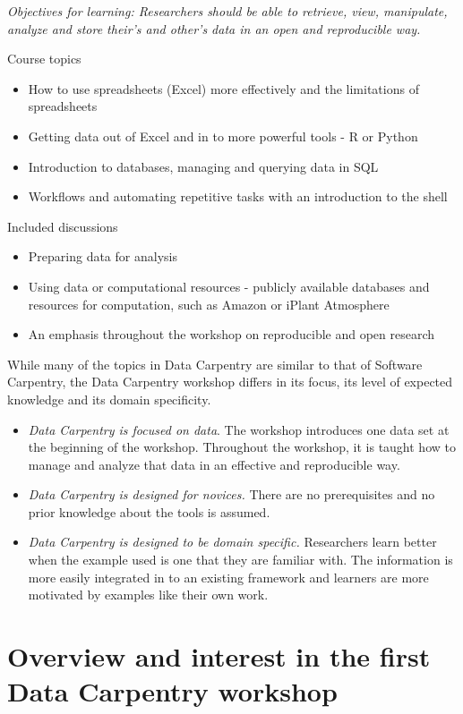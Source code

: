 \documentclass[11pt]{article}
\begin{document}
\emph{Objectives for learning: Researchers should be able to retrieve, view, manipulate, analyze and store their's and other's data in an open and reproducible way.}

Course topics
\begin{itemize}
\item How to use spreadsheets (Excel) more effectively and the limitations of spreadsheets
\item Getting data out of Excel and in to more powerful tools - R or Python
\item Introduction to databases, managing and querying data in SQL
\item Workflows and automating repetitive tasks with an introduction to the shell
\end{itemize}

Included discussions
\begin{itemize}
\item Preparing data for analysis
\item Using data or computational resources - publicly available databases and resources for computation, such as Amazon or  iPlant Atmosphere
\item An emphasis throughout the workshop on reproducible and open research 
\end{itemize}

While many of the topics in Data Carpentry are similar to that of Software Carpentry, the Data Carpentry 
workshop differs in its focus, its level of expected knowledge and its domain specificity.
\begin{itemize}
\item \emph{Data Carpentry is focused on data}. The workshop introduces one data set at the beginning of the
workshop. Throughout the workshop, it is taught how to manage and analyze that data in an effective and reproducible 
way.
\item \emph{Data Carpentry is designed for novices.} There are no prerequisites and no 
prior knowledge about the tools is assumed.
\item \emph{Data Carpentry is designed to be domain specific.} Researchers learn better when the example used is
one that they are familiar with. The information is more easily integrated in to an existing framework and learners 
are more motivated by examples like their own work.
\end{itemize}


\section{Overview and interest in the first Data Carpentry workshop}
\end{document}
